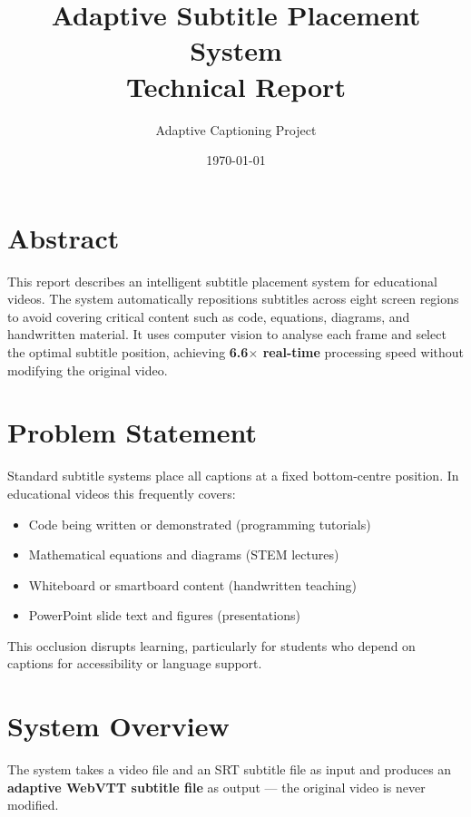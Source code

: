 \documentclass[11pt]{article}
\title{\textbf{Adaptive Subtitle Placement System}\\[4pt]
\large Technical Report}
\author{Adaptive Captioning Project}
\date{\today}
\begin{document}
\maketitle

\section*{Abstract}
This report describes an intelligent subtitle placement system for educational videos. The system automatically repositions subtitles across eight screen regions to avoid covering critical content such as code, equations, diagrams, and handwritten material. It uses computer vision to analyse each frame and select the optimal subtitle position, achieving \textbf{6.6$\times$ real-time} processing speed without modifying the original video.

\section{Problem Statement}
Standard subtitle systems place all captions at a fixed bottom-centre position. In educational videos this frequently covers:
\begin{itemize}[leftmargin=1.5em, itemsep=2pt]
    \item Code being written or demonstrated (programming tutorials)
    \item Mathematical equations and diagrams (STEM lectures)
    \item Whiteboard or smartboard content (handwritten teaching)
    \item PowerPoint slide text and figures (presentations)
\end{itemize}
This occlusion disrupts learning, particularly for students who depend on captions for accessibility or language support.

\section{System Overview}
The system takes a video file and an SRT subtitle file as input and produces an \textbf{adaptive WebVTT subtitle file} as output --- the original video is never modified.
\end{document}
